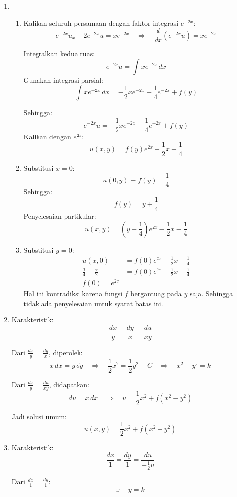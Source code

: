\documentclass{article}
\theoremstyle{definition}
\begin{document}
\begin{enumerate}
  \item \begin{enumerate}
    \item Kalikan seluruh persamaan dengan faktor integrasi \( e^{-2x} \):
    \[
    e^{-2x}u_x - 2e^{-2x}u = xe^{-2x}
    \quad \Rightarrow \quad
    \frac{d}{dx}(e^{-2x}u) = xe^{-2x}
    \]
    
    Integralkan kedua ruas:
    \[
    e^{-2x}u = \int xe^{-2x} \, dx
    \]
    Gunakan integrasi parsial:
    \[
    \int xe^{-2x} \, dx = -\frac{1}{2}xe^{-2x} - \frac{1}{4}e^{-2x} + f(y)
    \]
    
    Sehingga:
    \[
    e^{-2x}u = -\frac{1}{2}xe^{-2x} - \frac{1}{4}e^{-2x} + f(y)
    \]
    Kalikan dengan \( e^{2x} \):
    \[
    u(x,y) = f(y)e^{2x} - \frac{1}{2}x - \frac{1}{4}
    \]
    \item Substitusi \(x = 0\):
    \[
    u(0,y) = f(y) - \frac{1}{4}
    \]
    Sehingga:
    \[
    f(y) = y + \frac{1}{4}
    \]
    Penyelesaian partikular:
    \[
    u(x,y) = \left( y + \frac{1}{4} \right) e^{2x} - \frac{1}{2}x - \frac{1}{4}
    \]
    \item Substitusi \(y = 0\):
    \begin{align*}
      u(x,0) &= f(0)e^{2x} - \frac{1}{2}x - \frac{1}{4}\\
      \frac{3}{4} - \frac{x}{2} &= f(0)e^{2x} - \frac{1}{2}x - \frac{1}{4}\\
      f(0) = e^{2x}
    \end{align*}
    Hal ini kontradiksi karena fungsi $f$ bergantung pada $y$ saja. Sehingga tidak ada penyelesaian untuk syarat batas ini.
  \end{enumerate}
  \item Karakteristik:
  \[
  \frac{dx}{y} = \frac{dy}{x} = \frac{du}{xy}
  \]
  
  Dari \(\frac{dx}{y} = \frac{dy}{x}\), diperoleh:
  \[
  x\,dx = y\,dy
  \quad \Rightarrow \quad
  \frac{1}{2}x^2 = \frac{1}{2}y^2 + C
  \quad \Rightarrow \quad
  x^2 - y^2 = k
  \]
  
  Dari \(\frac{dx}{y} = \frac{du}{xy}\), didapatkan:
  \[
  du = x\,dx
  \quad \Rightarrow \quad
  u = \frac{1}{2}x^2 + f(x^2 - y^2)
  \]
  
  Jadi solusi umum:
  \[
  u(x,y) = \frac{1}{2}x^2 + f(x^2 - y^2)
  \]
  \item Karakteristik:
  \[
  \frac{dx}{1} = \frac{dy}{1} = \frac{du}{-\frac{1}{2}u}
  \]
  
  Dari \(\frac{dx}{1} = \frac{dy}{1}\):
  \[
  x - y = k
  \]
  

\end{enumerate}
\end{document}
